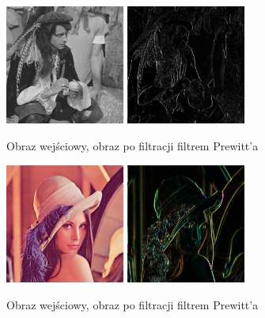 \documentclass[final,a4paper,openany,12pt]{mwbk}
\begin{document}
\begin{figure}[H]
	\begin{center}
		\includegraphics[width=0.35\textwidth]{pirate_gray}
		\includegraphics[width=0.35\textwidth]{pirate_gray_highpassPrewitt_result}
	\end{center}
	\caption{Obraz wejściowy, obraz po filtracji filtrem Prewitt'a}
\end{figure}

\begin{figure}[H]
	\begin{center}
		\includegraphics[width=0.35\textwidth]{lena_color}
		\includegraphics[width=0.35\textwidth]{lena_color_highpassPrewitt_result}
	\end{center}
	\caption{Obraz wejściowy, obraz po filtracji filtrem Prewitt'a}
\end{figure}
\end{document}
